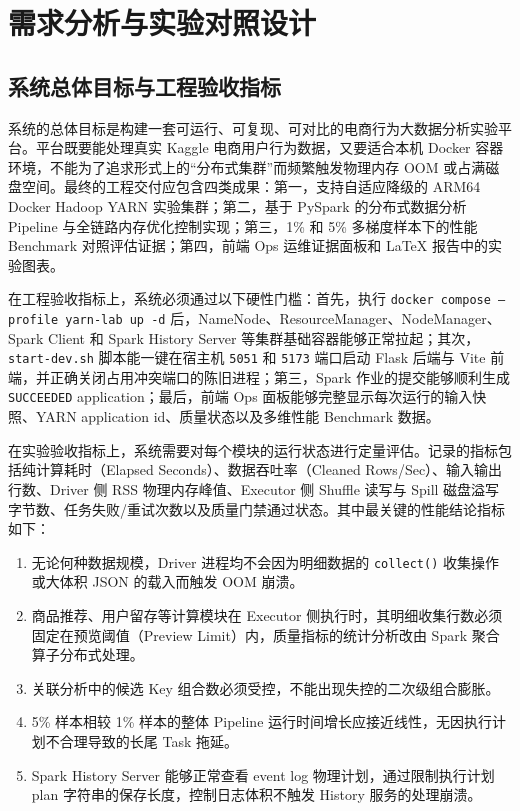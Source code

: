 
\chapter{需求分析与实验对照设计}

\section{系统总体目标与工程验收指标}

系统的总体目标是构建一套可运行、可复现、可对比的电商行为大数据分析实验平台。平台既要能处理真实 Kaggle 电商用户行为数据，又要适合本机 Docker 容器环境，不能为了追求形式上的“分布式集群”而频繁触发物理内存 OOM 或占满磁盘空间。最终的工程交付应包含四类成果：第一，支持自适应降级的 ARM64 Docker Hadoop YARN 实验集群；第二，基于 PySpark 的分布式数据分析 Pipeline 与全链路内存优化控制实现；第三，1\% 和 5\% 多梯度样本下的性能 Benchmark 对照评估证据；第四，前端 Ops 运维证据面板和 LaTeX 报告中的实验图表。

在工程验收指标上，系统必须通过以下硬性门槛：首先，执行 \texttt{docker compose --profile yarn-lab up -d} 后，NameNode、ResourceManager、NodeManager、Spark Client 和 Spark History Server 等集群基础容器能够正常拉起；其次，\texttt{start-dev.sh} 脚本能一键在宿主机 \texttt{5051} 和 \texttt{5173} 端口启动 Flask 后端与 Vite 前端，并正确关闭占用冲突端口的陈旧进程；第三，Spark 作业的提交能够顺利生成 \texttt{SUCCEEDED} application；最后，前端 Ops 面板能够完整显示每次运行的输入快照、YARN application id、质量状态以及多维性能 Benchmark 数据。

在实验验收指标上，系统需要对每个模块的运行状态进行定量评估。记录的指标包括纯计算耗时（Elapsed Seconds）、数据吞吐率（Cleaned Rows/Sec）、输入输出行数、Driver 侧 RSS 物理内存峰值、Executor 侧 Shuffle 读写与 Spill 磁盘溢写字节数、任务失败/重试次数以及质量门禁通过状态。其中最关键的性能结论指标如下：
\begin{enumerate}
    \item 无论何种数据规模，Driver 进程均不会因为明细数据的 \texttt{collect()} 收集操作或大体积 JSON 的载入而触发 OOM 崩溃。
    \item 商品推荐、用户留存等计算模块在 Executor 侧执行时，其明细收集行数必须固定在预览阈值（Preview Limit）内，质量指标的统计分析改由 Spark 聚合算子分布式处理。
    \item 关联分析中的候选 Key 组合数必须受控，不能出现失控的二次级组合膨胀。
    \item 5\% 样本相较 1\% 样本的整体 Pipeline 运行时间增长应接近线性，无因执行计划不合理导致的长尾 Task 拖延。
    \item Spark History Server 能够正常查看 event log 物理计划，通过限制执行计划 plan 字符串的保存长度，控制日志体积不触发 History 服务的处理崩溃。
\end{enumerate}

